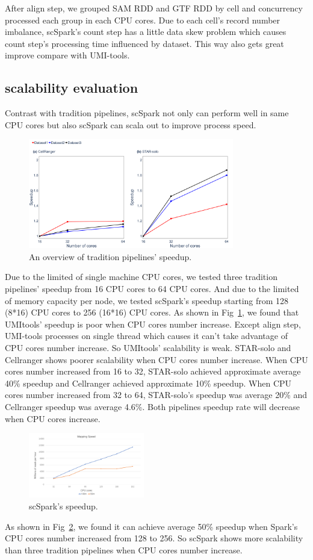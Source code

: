 \documentclass[conference]{IEEEtran}
\begin{document}
After align step, we grouped SAM RDD and GTF RDD by cell and concurrency processed each group in each CPU cores.
Due to each cell's record number imbalance, scSpark's count step has a little data skew problem which causes count step's processing time influenced by dataset.
This way also gets great improve compare with UMI-tools.
\fi

\subsection{scalability evaluation} 
Contrast with tradition pipelines, scSpark not only can perform well in same CPU cores but also scSpark can scala out to improve process speed.
\begin{figure}
	\includegraphics[width=0.8\textwidth]{fig5.pdf}
	\caption{An overview of tradition pipelines' speedup.} \label{fig5}
\end{figure}
Due to the limited of single machine CPU cores, we tested three tradition pipelines' speedup from 16 CPU cores to 64 CPU cores.
And due to the limited of memory capacity per node, we tested scSpark's speedup starting from 128 (8*16) CPU cores to 256 (16*16) CPU cores.
As shown in Fig~\ref{fig5}, we found that UMI\-tools' speedup is poor when CPU cores number increase.
Except align step, UMI-tools processes on single thread which causes it can't take advantage of CPU cores number increase.
So UMI\-tools' scalability is weak.
STAR-solo and Cellranger shows poorer scalability when CPU cores number increase.
When CPU cores number increased from 16 to 32, STAR-solo achieved approximate average 40\% speedup and Cellranger achieved approximate 10\% speedup.
When CPU cores number increased from 32 to 64, STAR-solo's speedup was average 20\% and Cellranger speedup was average 4.6\%.
Both pipelines speedup rate will decrease when CPU cores increase.

\begin{figure}
	\includegraphics[width=0.45\textwidth]{fig6.pdf}
	\caption{scSpark's speedup.} \label{fig6}
\end{figure}
As shown in Fig~\ref{fig6}, we found it can achieve average 50\% speedup when Spark's CPU cores number increased from 128 to 256.
So scSpark shows more scalability than three tradition pipelines when CPU cores number increase.
\end{document}
